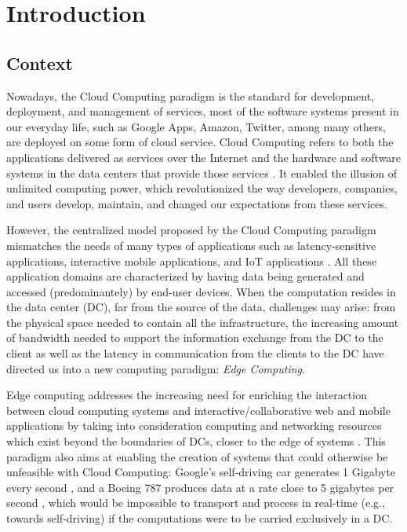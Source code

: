 


\chapter{Introduction}
\label{cha:introduction}



\section{Context} \label{sec:context}

Nowadays, the Cloud Computing paradigm is the standard for development, deployment, and management of services, most of the software systems present in our everyday life, such as Google Apps, Amazon, Twitter, among many others, are deployed on some form of cloud service. Cloud Computing refers to both the applications delivered as services over the Internet and the hardware and software systems in the data centers that provide those services \cite{10.1145/1721654.1721672}. It enabled the illusion of unlimited computing power, which revolutionized the way developers, companies, and users develop, maintain, and changed our expectations from these services.

However, the centralized model proposed by the Cloud Computing paradigm mismatches the needs of many types of applications such as latency-sensitive applications, interactive mobile applications, and IoT applications \cite{10.1145/3154815}. All these application domains are characterized by having data being generated and accessed (predominantely) by end-user devices. When the computation resides in the data center (DC), far from the source of the data, challenges may arise: from the physical space needed to contain all the infrastructure, the increasing amount of bandwidth needed to support the information exchange from the DC to the client as well as the latency in communication from the clients to the DC have directed us into a new computing paradigm: \textit{Edge Computing}.

Edge computing addresses the increasing need for enriching the interaction between cloud computing systems and interactive/collaborative web and mobile applications \cite{10.1145/242857.242867} by taking into consideration computing and networking resources which exist beyond the boundaries of DCs, closer to the edge of systems \cite{Leitao2018} \cite{7488250}. This paradigm also aims at enabling the creation of systems that could otherwise be unfeasible with Cloud Computing: Google's self-driving car generates 1 Gigabyte every second \cite{datafloq}, and a Boeing 787 produces data at a rate close to 5 gigabytes per second \cite{finnegan_2013}, which would be impossible to transport and process in real-time (e.g., towards self-driving) if the computations were to be carried exclusively in a DC.


